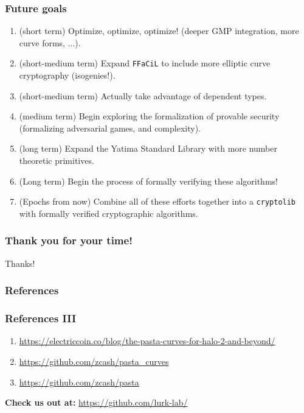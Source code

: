 \documentclass[options]{beamer}
\begin{document}
\begin{frame}[fragile]
    \frametitle{Future goals}

    \begin{enumerate}
        \item (short term) Optimize, optimize, optimize! (deeper GMP integration, more curve forms, ...).
        \item (short-medium term) Expand \verb+FFaCiL+ to include more elliptic curve cryptography (isogenies!).
        \item (short-medium term) Actually take advantage of dependent types.
        \item (medium term) Begin exploring the formalization of provable security (formalizing adversarial games, and complexity).
        \item (long term) Expand the Yatima Standard Library with more number theoretic primitives.
        \item (Long term) Begin the process of formally verifying these algorithms!
        \item (Epochs from now) Combine all of these efforts together into a \verb+cryptolib+ with formally verified cryptographic algorithms.
    \end{enumerate}

\end{frame}

\begin{frame}
    \frametitle{Thank you for your time!}
    \begin{center}
    Thanks!
    \end{center}
\end{frame}

\begin{frame}[allowframebreaks]
    \frametitle{References}
    \nocite{BERGERON1989403}
    \nocite{cryptoeprint:2023/369}
    \nocite{cryptoeprint:2012/549}
    \nocite{10.1007/3-540-44647-8_11}
    \nocite{cohen2005handbook}
    \nocite{joyofcryptography}
    \printbibliography

\end{frame}

\begin{frame}
    \frametitle{References III}

    \begin{enumerate}
        \item \url{https://electriccoin.co/blog/the-pasta-curves-for-halo-2-and-beyond/}
        \item \url{https://github.com/zcash/pasta_curves}
        \item \url{https://github.com/zcash/pasta}
    \end{enumerate}

    \vspace{30pt}

    {\bf Check us out at:}
    \url{https://github.com/lurk-lab/}
\end{frame}
\end{document}
